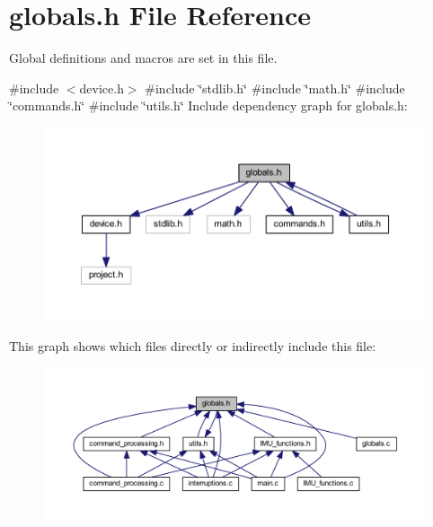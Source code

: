 \section{globals.\+h File Reference}
\label{globals_8h}


Global definitions and macros are set in this file.  


{\ttfamily \#include $<$device.\+h$>$}\newline
{\ttfamily \#include \char`\"{}stdlib.\+h\char`\"{}}\newline
{\ttfamily \#include \char`\"{}math.\+h\char`\"{}}\newline
{\ttfamily \#include \char`\"{}commands.\+h\char`\"{}}\newline
{\ttfamily \#include \char`\"{}utils.\+h\char`\"{}}\newline
Include dependency graph for globals.\+h\+:
\nopagebreak
\begin{figure}[H]
\begin{center}
\leavevmode
\includegraphics[width=350pt]{globals_8h__incl}
\end{center}
\end{figure}
This graph shows which files directly or indirectly include this file\+:
\nopagebreak
\begin{figure}[H]
\begin{center}
\leavevmode
\includegraphics[width=350pt]{globals_8h__dep__incl}
\end{center}
\end{figure}
